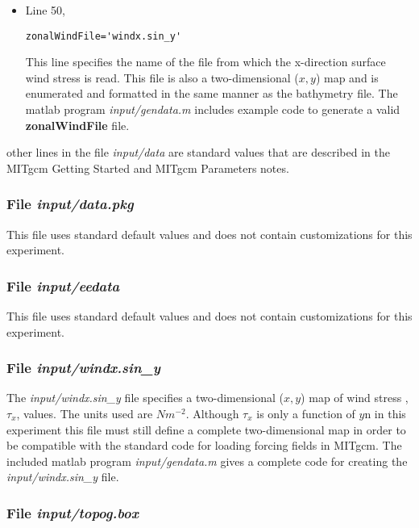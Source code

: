 \begin{itemize}
\item Line 50,
\begin{verbatim}
zonalWindFile='windx.sin_y'
\end{verbatim}
This line specifies the name of the file from which the x-direction
surface wind stress is read. This file is also a two-dimensional
($x,y$) map and is enumerated and formatted in the same manner as the 
bathymetry file. The matlab program {\it input/gendata.m} includes example 
code to generate a valid 
{\bf zonalWindFile} 
file.  

\end{itemize}

\noindent other lines in the file {\it input/data} are standard values
that are described in the MITgcm Getting Started and MITgcm Parameters
notes.

\begin{small}
% 
\end{small}

\subsubsection{File {\it input/data.pkg}}

This file uses standard default values and does not contain
customizations for this experiment.

\subsubsection{File {\it input/eedata}}

This file uses standard default values and does not contain
customizations for this experiment.

\subsubsection{File {\it input/windx.sin\_y}}

The {\it input/windx.sin\_y} file specifies a two-dimensional ($x,y$) 
map of wind stress ,$\tau_{x}$, values. The units used are $Nm^{-2}$.
Although $\tau_{x}$ is only a function of $y$n in this experiment
this file must still define a complete two-dimensional map in order
to be compatible with the standard code for loading forcing fields 
in MITgcm. The included matlab program {\it input/gendata.m} gives a complete
code for creating the {\it input/windx.sin\_y} file.

\subsubsection{File {\it input/topog.box}}


